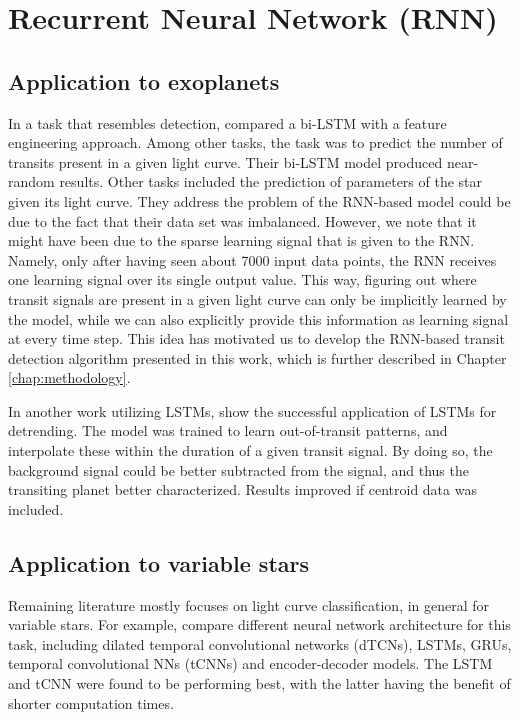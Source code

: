 
\section{Recurrent Neural Network (RNN)}

\subsection{Application to exoplanets}
In a task that resembles detection, \cite{hinners2018machine} compared a bi-LSTM with a feature engineering approach. Among other tasks, the task was to predict the number of transits present in a given light curve. Their bi-LSTM model produced near-random results. Other tasks included the prediction of parameters of the star given its light curve. They address the problem of the RNN-based model could be due to the fact that their data set was imbalanced. However, we note that it might have been due to the sparse learning signal that is given to the RNN. Namely, only after having seen about 7000 input data points, the RNN receives one learning signal over its single output value. This way, figuring out where transit signals are present in a given light curve can only be implicitly learned by the model, while we can also explicitly provide this information as learning signal at every time step. This idea has motivated us to develop the RNN-based transit detection algorithm presented in this work, which is further described in Chapter \ref{chap:methodology}. 

In another work utilizing LSTMs, \cite{morvan2020detrending} show the successful application of LSTMs for detrending. The model was trained to learn out-of-transit patterns, and interpolate these within the duration of a given transit signal. By doing so, the background signal could be better subtracted from the signal, and thus the transiting planet better characterized. Results improved if centroid data was included.

\subsection{Application to variable stars}
Remaining literature mostly focuses on light curve classification, in general for variable stars. For example, \cite{jamal2020neural} compare different neural network architecture for this task, including dilated temporal convolutional networks (dTCNs), LSTMs, GRUs, temporal convolutional NNs (tCNNs) and encoder-decoder models. The LSTM and tCNN were found to be performing best, with the latter having the benefit of shorter computation times. 

